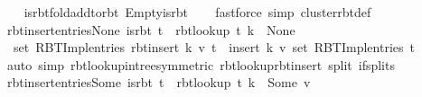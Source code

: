 \begin{isabellebody}
%
\isadelimproof
\ \ %
\endisadelimproof
%
\isatagproof
{}\isamarkupfalse%
\ is{\isacharunderscore}{\kern0pt}rbt{\isacharunderscore}{\kern0pt}fold{\isacharunderscore}{\kern0pt}add{\isacharunderscore}{\kern0pt}to{\isacharunderscore}{\kern0pt}rbt\ Empty{\isacharunderscore}{\kern0pt}is{\isacharunderscore}{\kern0pt}rbt\isanewline
\ \ \isamarkupfalse%
\ {\isacharparenleft}{\kern0pt}fastforce\ simp{\isacharcolon}{\kern0pt}\ cluster{\isacharunderscore}{\kern0pt}rbt{\isacharunderscore}{\kern0pt}def{\isacharparenright}{\kern0pt}%
\endisatagproof
{\isafoldproof}%
%
\isadelimproof
\isanewline
%
\endisadelimproof
\isanewline
{}\isamarkupfalse%
\ rbt{\isacharunderscore}{\kern0pt}insert{\isacharunderscore}{\kern0pt}entries{\isacharunderscore}{\kern0pt}None{\isacharcolon}{\kern0pt}\ {\isachardoublequoteopen}is{\isacharunderscore}{\kern0pt}rbt\ t\ {\isasymLongrightarrow}\ rbt{\isacharunderscore}{\kern0pt}lookup\ t\ k\ {\isacharequal}{\kern0pt}\ None\ {\isasymLongrightarrow}\isanewline
\ \ set\ {\isacharparenleft}{\kern0pt}RBT{\isacharunderscore}{\kern0pt}Impl{\isachardot}{\kern0pt}entries\ {\isacharparenleft}{\kern0pt}rbt{\isacharunderscore}{\kern0pt}insert\ k\ v\ t{\isacharparenright}{\kern0pt}{\isacharparenright}{\kern0pt}\ {\isacharequal}{\kern0pt}\ insert\ {\isacharparenleft}{\kern0pt}k{\isacharcomma}{\kern0pt}\ v{\isacharparenright}{\kern0pt}\ {\isacharparenleft}{\kern0pt}set\ {\isacharparenleft}{\kern0pt}RBT{\isacharunderscore}{\kern0pt}Impl{\isachardot}{\kern0pt}entries\ t{\isacharparenright}{\kern0pt}{\isacharparenright}{\kern0pt}{\isachardoublequoteclose}\isanewline
%
\isadelimproof
\ \ %
\endisadelimproof
%
\isatagproof
{}\isamarkupfalse%
\ {\isacharparenleft}{\kern0pt}auto\ simp{\isacharcolon}{\kern0pt}\ rbt{\isacharunderscore}{\kern0pt}lookup{\isacharunderscore}{\kern0pt}in{\isacharunderscore}{\kern0pt}tree{\isacharbrackleft}{\kern0pt}symmetric{\isacharbrackright}{\kern0pt}\ rbt{\isacharunderscore}{\kern0pt}lookup{\isacharunderscore}{\kern0pt}rbt{\isacharunderscore}{\kern0pt}insert\ split{\isacharcolon}{\kern0pt}\ if{\isacharunderscore}{\kern0pt}splits{\isacharparenright}{\kern0pt}%
\endisatagproof
{\isafoldproof}%
%
\isadelimproof
\isanewline
%
\endisadelimproof
\isanewline
{}\isamarkupfalse%
\ rbt{\isacharunderscore}{\kern0pt}insert{\isacharunderscore}{\kern0pt}entries{\isacharunderscore}{\kern0pt}Some{\isacharcolon}{\kern0pt}\ {\isachardoublequoteopen}is{\isacharunderscore}{\kern0pt}rbt\ t\ {\isasymLongrightarrow}\ rbt{\isacharunderscore}{\kern0pt}lookup\ t\ k\ {\isacharequal}{\kern0pt}\ Some\ v{\isacharprime}{\kern0pt}\ {\isasymLongrightarrow}\isanewline

\end{isabellebody}
